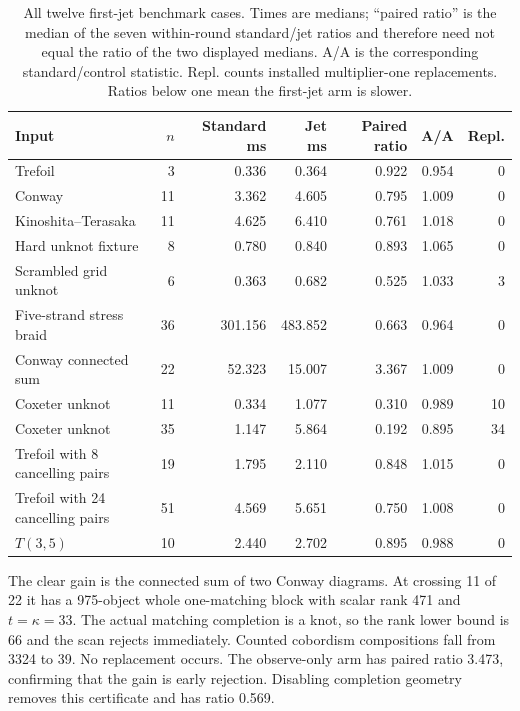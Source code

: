 \begin{table}[htbp]
\centering\small
\begin{tabular}{@{}lrrrrrr@{}}
\toprule
Input & $n$ & Standard ms & Jet ms & Paired ratio & A/A & Repl.\\
\midrule
Trefoil & 3 & 0.336 & 0.364 & 0.922 & 0.954 & 0\\
Conway & 11 & 3.362 & 4.605 & 0.795 & 1.009 & 0\\
Kinoshita--Terasaka & 11 & 4.625 & 6.410 & 0.761 & 1.018 & 0\\
Hard unknot fixture & 8 & 0.780 & 0.840 & 0.893 & 1.065 & 0\\
Scrambled grid unknot & 6 & 0.363 & 0.682 & 0.525 & 1.033 & 3\\
Five-strand stress braid & 36 & 301.156 & 483.852 & 0.663 & 0.964 & 0\\
Conway connected sum & 22 & 52.323 & 15.007 & 3.367 & 1.009 & 0\\
Coxeter unknot & 11 & 0.334 & 1.077 & 0.310 & 0.989 & 10\\
Coxeter unknot & 35 & 1.147 & 5.864 & 0.192 & 0.895 & 34\\
Trefoil with 8 cancelling pairs & 19 & 1.795 & 2.110 & 0.848 & 1.015 & 0\\
Trefoil with 24 cancelling pairs & 51 & 4.569 & 5.651 & 0.750 & 1.008 & 0\\
$T(3,5)$ & 10 & 2.440 & 2.702 & 0.895 & 0.988 & 0\\
\bottomrule
\end{tabular}
\caption{All twelve first-jet benchmark cases. Times are medians;
``paired ratio'' is the median of the seven within-round
standard/jet ratios and therefore need not equal the ratio of the two
displayed medians. A/A is the corresponding standard/control statistic.
Repl. counts installed multiplier-one replacements. Ratios below one
mean the first-jet arm is slower.}
\label{tab:jet-timings}
\end{table}

The clear gain is the connected sum of two Conway diagrams. At crossing
11 of 22 it has a 975-object whole one-matching block with scalar rank
471 and $t=\kappa=33$. The actual matching completion is a knot, so the
rank lower bound is 66 and the scan rejects immediately. Counted
cobordism compositions fall from 3324 to 39. No replacement occurs.
The observe-only arm has paired ratio 3.473, confirming that the gain is
early rejection. Disabling completion geometry removes this certificate
and has ratio 0.569.

